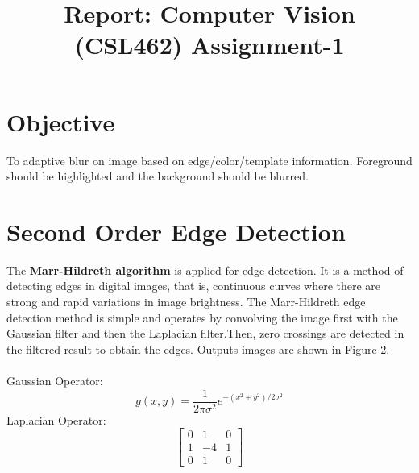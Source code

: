 \documentclass[extendedabs]{bmvc2k}
\begin{document}
\title{Report: Computer Vision (CSL462) Assignment-1}

%

\maketitle


\section{Objective}
To adaptive blur on image based on edge/color/template information. Foreground should be highlighted and the background should be blurred.

\section{Second Order Edge Detection}
The \textbf{Marr-Hildreth algorithm} is applied for edge detection. It is a method of detecting edges in digital images, that is, continuous curves where there are strong and rapid variations in image brightness. The Marr-Hildreth edge detection method is simple and operates by convolving the image first with the Gaussian filter and then the Laplacian filter.Then, zero crossings are detected in the filtered result to obtain the edges. Outputs images are shown in Figure-2.\\
\\
Gaussian Operator:
\begin{equation}
    g(x,y)=\frac{1}{{2\pi\sigma^2  }}e^{{{ - ({x}^2 +{y}^2)}/{2\sigma ^2 }}}
\end{equation}
Laplacian Operator:
\begin{equation}
\begin{bmatrix}
0&1&0\\
1&-4&1\\
0&1&0
\end{bmatrix}
\end{equation}
\end{document}
